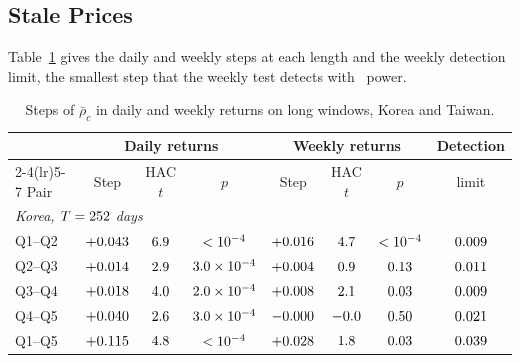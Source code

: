 \documentclass[a4paper,fleqn]{cas-sc}
\begin{document}
\subsection{Stale Prices}\label{subsec:trading_arrangements}

Table~\ref{tab:weekly_rho_c} gives the daily and weekly steps at each length and the weekly detection limit, the smallest step that the weekly test detects with \detectPowerPct\ power.

\begin{table}[pos=htbp]
\centering
\begin{threeparttable}
\caption{Steps of $\bar\rho_c$ in daily and weekly returns on long windows, Korea and Taiwan.}\label{tab:weekly_rho_c}
\footnotesize
\setlength{\tabcolsep}{4pt}
\begin{tabular}{l ccc ccc c}
\toprule
 & \multicolumn{3}{c}{Daily returns} & \multicolumn{3}{c}{Weekly returns} & Detection \\
\cmidrule(lr){2-4}\cmidrule(lr){5-7}
Pair & Step & HAC $t$ & $p$ & Step & HAC $t$ & $p$ & limit \\
\midrule
\multicolumn{8}{l}{\textit{Korea, $T = 252$ days}} \\
Q1--Q2 & $+0.043$ & $6.9$ & $< 10^{-4}$ & $+0.016$ & $4.7$ & $< 10^{-4}$ & $0.009$ \\
Q2--Q3 & $+0.014$ & $2.9$ & $3.0 \times 10^{-4}$ & $+0.004$ & $0.9$ & $0.13$ & $0.011$ \\
Q3--Q4 & $+0.018$ & $4.0$ & $2.0 \times 10^{-4}$ & $+0.008$ & $2.1$ & $0.03$ & $0.009$ \\
Q4--Q5 & $+0.040$ & $2.6$ & $3.0 \times 10^{-4}$ & $-0.000$ & $-0.0$ & $0.50$ & $0.021$ \\
Q1--Q5 & $+0.115$ & $4.8$ & $< 10^{-4}$ & $+0.028$ & $1.8$ & $0.03$ & $0.039$ \\

\end{tabular}
\end{threeparttable}
\end{table}
\end{document}
